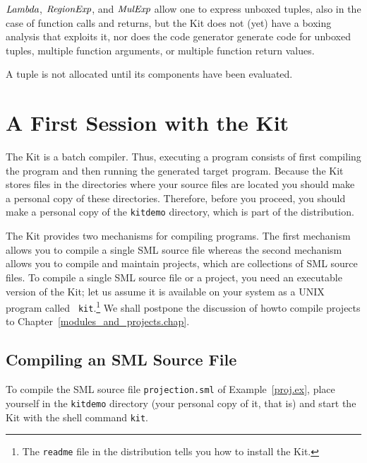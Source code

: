 \documentclass[12pt]{book}
\begin{document}
$\hbox{\it Lambda}$, $\hbox{\it RegionExp}$, and $\hbox{\it MulExp}$ allow one to express unboxed tuples, 
also in the case of function calls and returns, but the Kit does not 
(yet) have a boxing analysis that exploits it, nor does the 
code generator generate code for unboxed tuples, multiple function arguments,
or multiple function return values.

A tuple is not allocated until its components have been evaluated.

\section{A First Session with the Kit}
\label{tryit.sec}
The Kit is a batch compiler. Thus, executing a
program consists of first compiling the program and then running the
generated target program. Because the Kit stores files in the
directories where your source files are located you should make a
personal copy of these directories. Therefore, before you proceed, you
should make a personal copy of the {\tt kitdemo} directory, which is
part of the distribution.

The Kit provides two mechanisms for compiling programs. The first
mechanism allows you to compile a single SML source file whereas the
second mechanism allows you to compile and maintain projects, which
are collections of SML source files. To compile a single SML source
file or a project, you need an executable version of the Kit; let us
assume it is available on your system as a UNIX program called {\tt
  kit}.\footnote{The {\tt readme} file in the distribution tells you
  how to install the Kit.}  We shall postpone the discussion of howto
compile projects to Chapter~\ref{modules_and_projects.chap}.

\subsection{Compiling an SML Source File}
To compile the SML source file {\tt projection.sml} of
Example~\ref{proj.ex}, place yourself in the {\tt kitdemo} directory
(your personal copy of it, that is) and start the Kit with the shell
command {\tt kit}.
\end{document}
